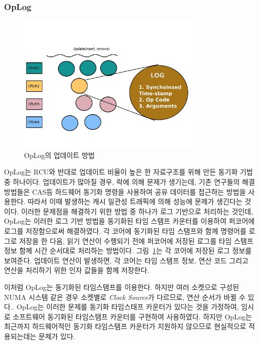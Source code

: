 \subsubsection{OpLog}

\begin{figure}[h]
    \centering
    \includegraphics[width=0.8\textwidth]{fig/oplog_log}
    \caption{OpLog의 업데이트 방법}
  \label{fig:oplog}
\end{figure}

OpLog는 RCU와 반대로 업데이트 비율이 높은 한 자료구조를 위해 만든 
동기화 기법 중 하나이다.
업데이트가 많아질 경우, 락에 의해 문제가 생기는데, 기존 연구들의 해결 방법들은 
CAS등 하드웨어 동기화 명령을 사용하여 공유 데이터를 접근하는 방법을 사용한다.
따라서 이때 발생하는 캐시 일관성 트래픽에 의해 
성능에 문제가 생긴다는 것이다. 
이러한 문제점을 해결하기 위한 방법 중 하나가 로그 기반으로 처리하는 것인데, OpLog는 이러한 로그 기반 
방법을 동기화된 타임 스탬프 카운터를 이용하여 퍼코어에 로그를 저장함으로써 해결하였다. 
각 코어에 동기화된 타임 스탬프와 함께 명령어를 로그로 저장을 한 다음, 읽기 연산이 수행되기 전에 
퍼코어에 저장된 로그를 타임 스탬프 정보 함께 시간 순서대로 처리하는 방법이다.
그림~\ref{fig:oplog}는 각 코어에 저장된 로그 정보를 보여준다.
업데이트 연산이 발생하면, 각 코어는 타임 스탬프 정보, 연산 코드 그리고 연산을 처리하기 위한 
인자 값들을 함께 저장한다.

이처럼 OpLog는 동기화된 타임스탬프를 이용한다. 
하지만 여러 소켓으로 구성된 NUMA 시스템 같은 경우 소켓별로 \textit{Clock Source}가 다르므로, 
연산 순서가 바뀔 수 있다..
OpLog는 이러한 문제를 동기화 타임스태프 카운터가 있다는 것을 가정하여, 
임시로 소프트웨어 동기화된 타임스탬프 카운터를 구현하여 사용하였다. 
하지만 OpLog는 최근까지 하드웨어적인 동기화 타임스탬프 카운터가 지원하지 않으므로 
현실적으로 적용되는데는 문제가 있다.
